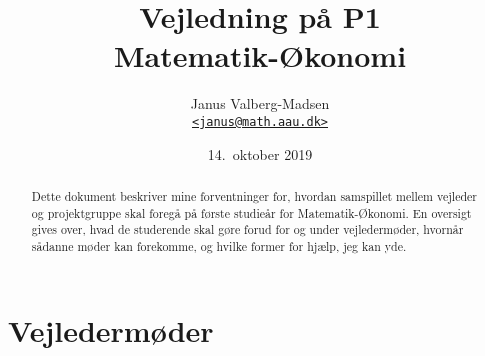\documentclass[12pt,a4paper,oneside,final]{article}
\title{
  Vejledning på P1\\
  Matematik-{\O}konomi
}
\author{
  Janus Valberg-Madsen\\
  \href{mailto:janus@math.aau.dk}{\texttt{<janus@math.aau.dk>}}
}
\date{14.\ oktober 2019}
\begin{document}
\maketitle

\renewcommand{\abstractname}{Om dette dokument}
\begin{abstract}
  Dette dokument beskriver mine forventninger for, hvordan samspillet mellem vejleder og projektgruppe skal foregå på første studieår for Matematik-Økonomi.
  En oversigt gives over, hvad de studerende skal gøre forud for og under vejledermøder, hvornår sådanne møder kan forekomme, og hvilke former for hjælp, jeg kan yde.
\end{abstract}


\section{Vejledermøder}
\end{document}
